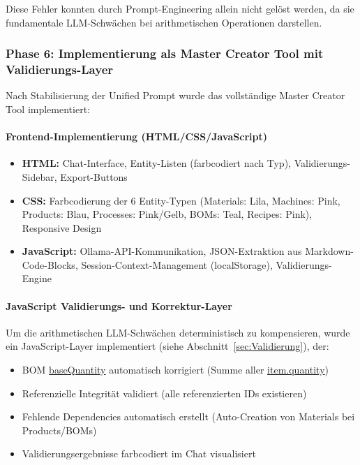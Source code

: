 \noindent Diese Fehler konnten durch Prompt-Engineering allein nicht gelöst werden, da sie fundamentale LLM-Schwächen bei arithmetischen Operationen darstellen.

\subsubsection{Phase 6: Implementierung als Master Creator Tool mit Validierungs-Layer}

Nach Stabilisierung der Unified Prompt wurde das vollständige Master Creator Tool implementiert:

\paragraph{Frontend-Implementierung (HTML/CSS/JavaScript)}

\begin{itemize}
    \item \textbf{HTML:} Chat-Interface, Entity-Listen (farbcodiert nach Typ), Validierungs-Sidebar, Export-Buttons
    \item \textbf{CSS:} Farbcodierung der 6 Entity-Typen (Materials: Lila, Machines: Pink, Products: Blau, Processes: Pink/Gelb, BOMs: Teal, Recipes: Pink), Responsive Design
    \item \textbf{JavaScript:} Ollama-API-Kommunikation, JSON-Extraktion aus Markdown-Code-Blocks, Session-Context-Management (localStorage), Validierungs-Engine
\end{itemize}

\paragraph{JavaScript Validierungs- und Korrektur-Layer}

Um die arithmetischen LLM-Schwächen deterministisch zu kompensieren, wurde ein JavaScript-Layer implementiert (siehe Abschnitt~\ref{sec:Validierung}), der:

\begin{itemize}
    \item BOM \url{baseQuantity} automatisch korrigiert (Summe aller \url{item.quantity})
    \item Referenzielle Integrität validiert (alle referenzierten IDs existieren)
    \item Fehlende Dependencies automatisch erstellt (Auto-Creation von Materials bei Products/BOMs)
    \item Validierungsergebnisse farbcodiert im Chat visualisiert
\end{itemize}


